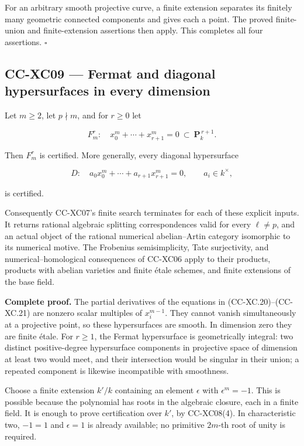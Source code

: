 For an arbitrary smooth projective curve, a finite extension separates
its finitely many geometric connected components and gives each a point.
The proved finite-union and finite-extension assertions then apply. This
completes all four assertions. \(\square\)

\subsection{CC-XC09 --- Fermat and diagonal hypersurfaces in every
dimension}\label{cc-xc09-fermat-and-diagonal-hypersurfaces-in-every-dimension}

Let \(m\ge2\), let \(p\nmid m\), and for \(r\ge0\) let

\[
 F_m^r:\quad x_0^m+\cdots+x_{r+1}^m=0
       \ \subset\ \mathbf P_k^{\,r+1}.
 \tag{CC-XC.20}
\]

Then \(F_m^r\) is certified. More generally, every diagonal hypersurface

\[
 D:\quad a_0x_0^m+\cdots+a_{r+1}x_{r+1}^m=0,
 \qquad a_i\in k^\times,
 \tag{CC-XC.21}
\]

is certified.

Consequently CC-XC07's finite search terminates for each of these
explicit inputs. It returns rational algebraic splitting correspondences
valid for every \(\ell\ne p\), and an actual object of the rational
numerical abelian--Artin category isomorphic to its numerical motive.
The Frobenius semisimplicity, Tate surjectivity, and
numerical--homological consequences of CC-XC06 apply to their products,
products with abelian varieties and finite étale schemes, and finite
extensions of the base field.

\textbf{Complete proof.} The partial derivatives of the equations in
(CC-XC.20)--(CC-XC.21) are nonzero scalar multiples of \(x_i^{m-1}\).
They cannot vanish simultaneously at a projective point, so these
hypersurfaces are smooth. In dimension zero they are finite étale. For
\(r\ge1\), the Fermat hypersurface is geometrically integral: two
distinct positive-degree hypersurface components in projective space of
dimension at least two would meet, and their intersection would be
singular in their union; a repeated component is likewise incompatible
with smoothness.

Choose a finite extension \(k'/k\) containing an element \(\epsilon\)
with \(\epsilon^m=-1\). This is possible because the polynomial has
roots in the algebraic closure, each in a finite field. It is enough to
prove certification over \(k'\), by CC-XC08(4). In characteristic two,
\(-1=1\) and \(\epsilon=1\) is already available; no primitive \(2m\)-th
root of unity is required.

